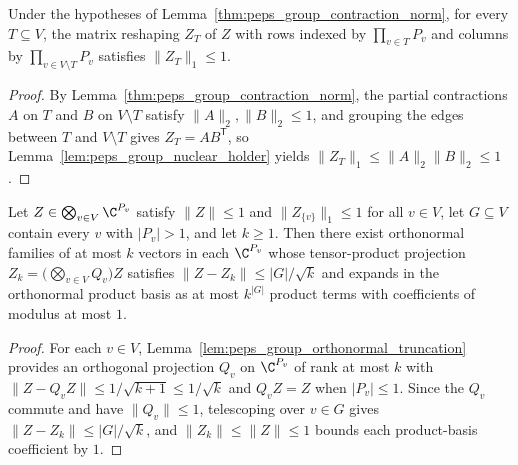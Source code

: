 \begin{lemma}
    \label{thm:peps_group_contraction_nuclear}
    \leanok
    Under the hypotheses of Lemma~\ref{thm:peps_group_contraction_norm}, for
    every $T\subseteq V$, the matrix reshaping $Z_T$ of $Z$ with rows indexed
    by $\prod_{v\in T}P_v$ and columns by $\prod_{v\in V\setminus T}P_v$
    satisfies $\lVert Z_T\rVert_1\le1$.
\end{lemma}

\begin{proof}\leanok
    By Lemma~\ref{thm:peps_group_contraction_norm}, the partial contractions
    $A$ on $T$ and $B$ on $V\setminus T$ satisfy $\lVert A\rVert_2,\lVert B\rVert_2\le1$,
    and grouping the edges between $T$ and $V\setminus T$ gives
    $Z_T=AB^{\mathsf T}$, so Lemma~\ref{lem:peps_group_nuclear_holder} yields
    $\lVert Z_T\rVert_1\le\lVert A\rVert_2\lVert B\rVert_2\le1$.
\end{proof}

\begin{lemma}
    \label{lem:peps_group_truncation_abstract}
    \leanok
    Let $Z\in\bigotimes_{v\in V}\C^{P_v}$ satisfy $\lVert Z\rVert\le1$ and
    $\lVert Z_{\{v\}}\rVert_1\le1$ for all $v\in V$, let $G\subseteq V$ contain
    every $v$ with $|P_v|>1$, and let $k\ge1$. Then there exist orthonormal
    families of at most $k$ vectors in each $\C^{P_v}$ whose tensor-product
    projection $Z_k=\bigl(\bigotimes_{v\in V}Q_v\bigr)Z$ satisfies
    $\lVert Z-Z_k\rVert\le|G|/\sqrt{k}$ and expands in the orthonormal product
    basis as at most $k^{|G|}$ product terms with coefficients of modulus at
    most $1$.
\end{lemma}

\begin{proof}\leanok
    For each $v\in V$, Lemma~\ref{lem:peps_group_orthonormal_truncation}
    provides an orthogonal projection $Q_v$ on $\C^{P_v}$ of rank at most $k$
    with $\lVert Z-Q_v Z\rVert\le1/\sqrt{k+1}\le1/\sqrt{k}$ and $Q_v Z=Z$ when
    $|P_v|\le1$. Since the $Q_v$ commute and have $\lVert Q_v\rVert\le1$,
    telescoping over $v\in G$ gives $\lVert Z-Z_k\rVert\le|G|/\sqrt k$, and
    $\lVert Z_k\rVert\le\lVert Z\rVert\le1$ bounds each product-basis
    coefficient by $1$.
\end{proof}

